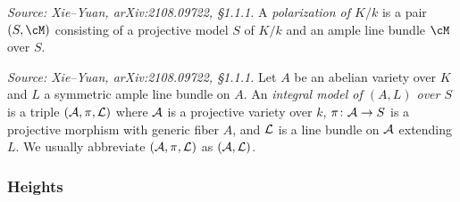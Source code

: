 \begin{definition}[Polarization]
  \label{def:Polarization}
  \textit{Source: Xie--Yuan, arXiv:2108.09722, \S1.1.1.}
  A \emph{polarization of \(K/k\)} is a pair \((S, \cM)\) consisting of a projective model
  \(S\) of \(K/k\) and an ample line bundle \(\cM\) over \(S\).
\end{definition}

\begin{definition}
  \label{def:IntegralModel}
  \textit{Source: Xie--Yuan, arXiv:2108.09722, \S1.1.1.}
  Let \(A\) be an abelian variety over \(K\) and \(L\) a symmetric ample line bundle on \(A\).
  An \emph{integral model of \((A,L)\) over \(S\)} is a triple \((\mathcal{A}, \pi, \mathcal{L})\) where
  \(\mathcal{A}\) is a projective variety over \(k\),
  \(\pi\colon \mathcal{A} \to S\) is a projective morphism with generic fiber \(A\),
  and \(\mathcal{L}\) is a line bundle on \(\mathcal{A}\) extending \(L\).
  We usually abbreviate \((\mathcal{A},\pi,\mathcal{L})\) as \((\mathcal{A},\mathcal{L})\).
\end{definition}

\subsubsection{Heights}

